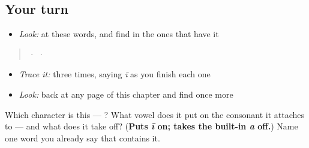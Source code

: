 \subsection*{Your turn}
\begin{itemize}
\raggedright
  \item \emph{Look:} at these words, and find  in the ones that have it
\end{itemize}

\begin{quote}
  ·    ·  
\end{quote}

\begin{itemize}
\raggedright
  \item \emph{Trace it:}  three times, saying \emph{ī} as you finish each one
  \item \emph{Look:} back at any page of this chapter and find  once more
\end{itemize}

\begin{tcolorbox}[breakable,colback=teal!4,colframe=teal!35!black,title={Before you move on}]
Which character is this — ? What vowel does it put on the consonant it attaches to — and what does it take off? (\textbf{Puts \emph{ī} on; takes the built-in \emph{a} off.}) Name one word you already say that contains it.
\end{tcolorbox}
